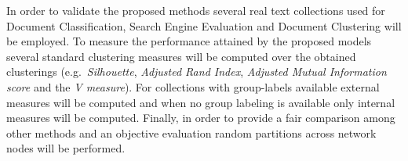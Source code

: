 \documentclass[10pt]{article}
\begin{document}

In order to validate the proposed methods several real text collections used for Document Classification, Search Engine Evaluation and Document Clustering will be employed. To measure the performance attained by the proposed models several standard clustering measures will be computed over the obtained clusterings (e.g.\ \textit{Silhouette}, \textit{Adjusted Rand Index}, \textit{Adjusted Mutual Information score} and the \textit{V measure}). For collections with group-labels available external
measures will be computed and when no group labeling is available only internal measures will be computed. Finally, in order to provide a fair comparison among other methods and an objective evaluation random partitions across network nodes will be performed.
\end{document}
